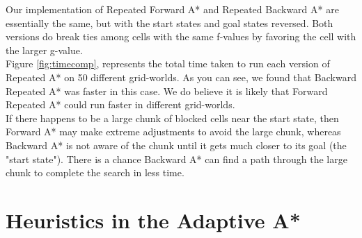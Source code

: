\documentclass[titlepage]{article}
\begin{document}
    \noindent Our implementation of Repeated Forward A* and Repeated Backward A* are essentially the same, but with the start states and goal states reversed. Both versions do break ties among cells with the same f-values by favoring the cell with the larger g-value.\\
    \indent Figure \ref{fig:timecomp}, represents the total time taken to run each version of Repeated A* on 50 different grid-worlds. As you can see, we found that Backward Repeated A* was faster in this case. We do believe it is likely that Forward Repeated A* could run faster in different grid-worlds. \\
    \indent If there happens to be a large chunk of blocked cells near the start state, then Forward A* may make extreme adjustments to avoid the large chunk, whereas Backward A* is not aware of the chunk until it gets much closer to its goal (the "start state"). There is a chance Backward A* can find a path through the large chunk to complete the search in less time. \\
    
\section{Heuristics in the Adaptive A*}
\end{document}
